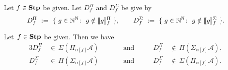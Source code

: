 \documentclass[main.tex]{subfiles}
\begin{document}
\begin{dfn}
Let $f\in\mathbf{Stp}$ be given.
Let $D^\Pi_f$
and $D^\Sigma_f$ be give by
\begin{equation*}
D^\Pi_f \ \eqdf \ 
\{\  g\in\N^\N\colon\ g\notin \decode{g}^\Pi_f\ \},
\qquad
D^\Sigma_f \ \eqdf \ 
\{\  g\in\N^\N\colon\ g\notin \decode{g}^\Sigma_f\ \}.
\end{equation*}
\end{dfn}

\begin{thm}
\label{T:borel-hierarchy}
Let~$f\in \mathbf{Stp}$
be given.
Then we have
\begin{alignat*}{3}
D^\Pi_f \,&\in\, \Sigma(\Pi_{\alpha[f]} \mathcal{A})
\qquad&&\text{and}\qquad&
D^\Pi_f \,&\notin\, \Pi(\Sigma_{\alpha[f]} \mathcal{A}),\\
D^\Sigma_f \,&\in\, \Pi(\Sigma_{\alpha[f]} \mathcal{A})
\qquad&&\text{and}\qquad&
D^\Sigma_f \,&\notin\, \Sigma(\Pi_{\alpha[f]} \mathcal{A}).
\end{alignat*}
\end{thm}
\end{document}

